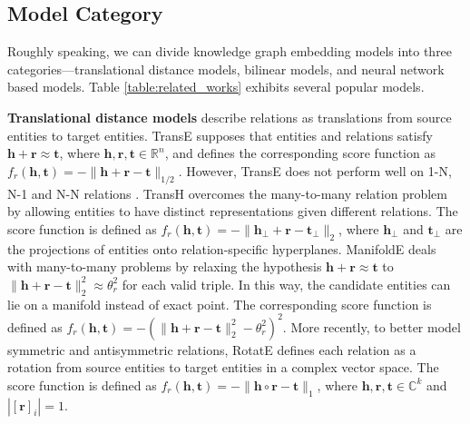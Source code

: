 \documentclass[letterpaper]{article} \usepackage{aaai20}  \usepackage{times}  \usepackage{helvet} \usepackage{courier}  \usepackage[hyphens]{url}  \usepackage{graphicx} \urlstyle{rm} \def\UrlFont{\rm}  \usepackage{graphicx}  \frenchspacing  \setlength{\pdfpagewidth}{8.5in}  \setlength{\pdfpageheight}{11in}
\newcommand{\citep}{\cite}
\begin{document}
\subsection{Model Category}
Roughly speaking, we can divide knowledge graph embedding models into three categories---translational distance models, bilinear models, and neural network based models. Table \ref{table:related_works} exhibits several popular models.

\textbf{Translational distance models} describe relations as translations from source entities to target entities. TransE \citep{transe} supposes that entities and relations satisfy $\textbf{h}+\textbf{r}\approx \textbf{t}$, where $\textbf{h}, \textbf{r}, \textbf{t} \in \mathbb{R}^n$, and defines the corresponding score function as $f_r(\textbf{h},\textbf{t})=-\|\textbf{h}+\textbf{r}-\textbf{t}\|_{1/2}$. However, TransE does not perform well on 1-N, N-1 and N-N relations \citep{transh}. 
TransH \citep{transh} overcomes the many-to-many relation problem by allowing entities to have distinct representations given different relations. 
The score function is defined as $f_r(\textbf{h},\textbf{t})=-\|\textbf{h}_{\perp}+\textbf{r}-\textbf{t}_{\perp}\|_2$, where $\textbf{h}_{\perp}$ and $\textbf{t}_{\perp}$ are the projections of entities onto relation-specific hyperplanes. 
ManifoldE \citep{manifolde} deals with many-to-many problems by relaxing the hypothesis $\textbf{h}+\textbf{r}\approx \textbf{t}$ to $\|\textbf{h}+\textbf{r}-\textbf{t}\|_2^2\approx\theta_r^2$ for each valid triple. In this way, the candidate entities can lie on a manifold instead of exact point. The corresponding score function is defined as $f_r(\textbf{h},\textbf{t})=-(\|\textbf{h}+\textbf{r}-\textbf{t}\|_2^2-\theta_r^2)^2$.
More recently, to better model symmetric and antisymmetric relations, RotatE \citep{rotate} defines each relation as a rotation from source entities to target entities in a complex vector space. The score function is defined as $f_r(\textbf{h},\textbf{t})=-\|\textbf{h}\circ \textbf{r}-\textbf{t}\|_1$, where $\textbf{h},\textbf{r},\textbf{t}\in\mathbb{C}^k$ and $|[\textbf{r}]_i|=1$.
\end{document}
